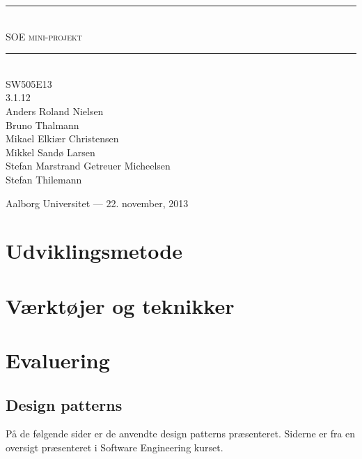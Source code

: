 



\begin{titlepage}
\newcommand{\HRule}{\rule{\linewidth}{0.5mm}}

\begin{center}

\HRule \\[0.5cm]
\textsc{ \Huge SOE mini-projekt}\\[0.3cm]

\HRule \\[1cm]

\textsc{\Large SW505E13 \\ 3.1.12}\\[0.5cm]

{\large
Anders Roland Nielsen \\
Bruno Thalmann \\
Mikael Elkiær Christensen \\
Mikkel Sandø Larsen \\
Stefan Marstrand Getreuer Micheelsen \\
Stefan Thilemann
}

\vfill

{\large Aalborg Universitet --- 22. november, 2013}

\end{center}

\end{titlepage}

\tableofcontents

\chapter{Udviklingsmetode}\label{udviklingsmetode}

\chapter{Værktøjer og teknikker}

\chapter{Evaluering}



\begin{appendices}
\chapter{Design patterns}
\label{appendix:patterns}
På de følgende sider er de anvendte design patterns præsenteret.
Siderne er fra en oversigt præsenteret i Software Engineering kurset.

\end{appendices}

